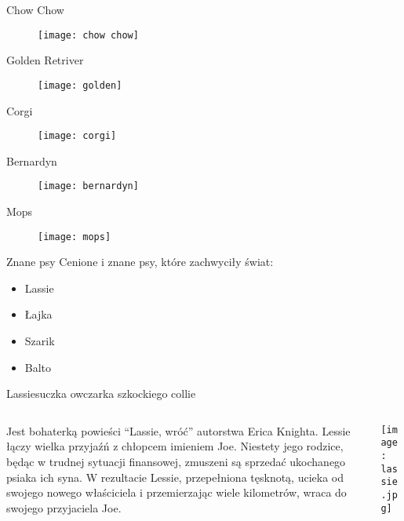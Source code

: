 \documentclass{beamer}
\begin{document}
	\begin{frame}{Chow Chow}
		\begin{figure}
			\texttt{[image: chow chow]}
		\end{figure}
	\end{frame}
	\begin{frame}{Golden Retriver}
		\begin{figure}
			\texttt{[image: golden]}
		\end{figure}
	\end{frame}
	\begin{frame}{Corgi}
		\begin{figure}
			\texttt{[image: corgi]}
		\end{figure}
	\end{frame}
	\begin{frame}{Bernardyn}
		\begin{figure}
			\texttt{[image: bernardyn]}
		\end{figure}
	\end{frame}
	\begin{frame}{Mops}
		\begin{figure}
			\texttt{[image: mops]}
		\end{figure}
	\end{frame}
	\begin{frame}{Znane psy}
		Cenione i znane psy, które zachwyciły świat:
		\begin{itemize}
			\item Lassie \pause
			\item Łajka \pause
			\item Szarik \pause
			\item Balto
		\end{itemize}
	\end{frame}
	\begin{frame}{Lassie}{suczka owczarka szkockiego collie}
		\begin{columns}
		\begin{column}{0.5\textwidth}
			Jest bohaterką powieści “Lassie, wróć” autorstwa Erica Knighta. Lessie łączy wielka przyjaźń z chłopcem imieniem Joe. Niestety jego rodzice, będąc w trudnej sytuacji finansowej, zmuszeni są sprzedać ukochanego psiaka ich syna. W rezultacie Lessie, przepełniona tęsknotą, ucieka od swojego nowego właściciela i przemierzając wiele kilometrów, wraca do swojego przyjaciela Joe.
		\end{column}
		\begin{column}{0.5\textwidth}
			\texttt{[image: lassie.jpg]}
		\end{column}
		\end{columns}
	\end{frame}
\end{document}
